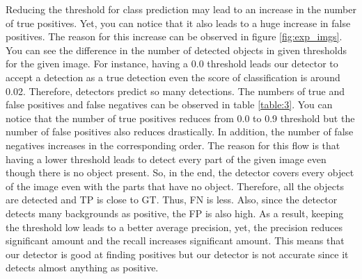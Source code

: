 \documentclass{article}
\begin{document}
Reducing the threshold for class prediction may lead to an increase in the number of true positives. Yet, 
you can notice that it also leads to a huge increase in false positives. The reason for this increase can 
be observed in figure \ref{fig:exp_imgs}. You can see the difference in the number of detected objects in 
given thresholds for the given image. For instance, having a 0.0 threshold leads our detector to accept a detection 
as a true detection even the score of classification is around 0.02. Therefore, detectors predict so many 
detections. The numbers of true and false positives and false negatives  can be observed in table \ref{table:3}.
You can notice that the number of true positives reduces from 0.0  to 0.9 threshold but the number of false 
positives also reduces drastically. In addition, the number of false negatives increases in the corresponding order. 
The reason for this flow is that having a lower threshold leads to detect every part of the given image even though 
there is no object present. So, in the end, the detector covers every object of the image even with the parts that have 
no object. Therefore, all the objects are detected and TP is close to GT. Thus, FN is less. Also, since the detector 
detects many backgrounds as positive, the FP is also high. As a result, keeping the threshold low leads to a better 
average precision, yet, the precision reduces significant amount and the recall increases significant amount. This means 
that our detector is good at finding positives but our detector is not accurate since it detects 
almost anything as positive.  
\end{document}
